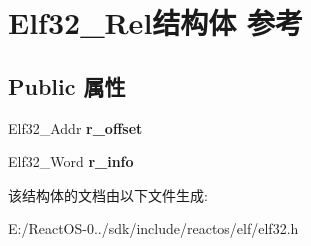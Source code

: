 \hypertarget{struct_elf32___rel}{}\section{Elf32\+\_\+\+Rel结构体 参考}
\label{struct_elf32___rel}
\subsection*{Public 属性}
\begin{DoxyCompactItemize}
\item 
\mbox{\label{struct_elf32___rel_addcf5ef67ababeb4940889e912c11eff}} 
Elf32\+\_\+\+Addr {\bfseries r\+\_\+offset}
\item 
\mbox{\label{struct_elf32___rel_a81c52bb1589056c5d37d58b9bfe2a046}} 
Elf32\+\_\+\+Word {\bfseries r\+\_\+info}
\end{DoxyCompactItemize}


该结构体的文档由以下文件生成\+:\begin{DoxyCompactItemize}
\item 
E\+:/\+React\+O\+S-\/0../sdk/include/reactos/elf/elf32.\+h\end{DoxyCompactItemize}
